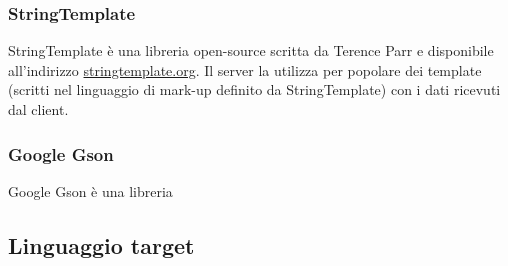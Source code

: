 \subsubsection{StringTemplate}
StringTemplate è una libreria open-source scritta da Terence Parr e disponibile all'indirizzo \url{stringtemplate.org}. Il server la utilizza per popolare dei template (scritti nel linguaggio di mark-up definito da StringTemplate) con i dati ricevuti dal client.

\subsubsection{Google Gson}
Google Gson è una libreria 




\subsection{Linguaggio target}

